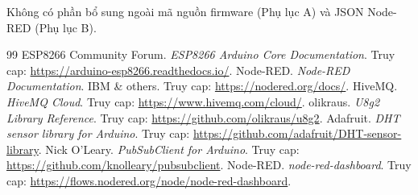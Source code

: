 \documentclass[13pt,a4paper]{article}
\begin{document}
Không có phần bổ sung ngoài mã nguồn firmware (Phụ lục A) và JSON Node-RED (Phụ lục B).

\begin{thebibliography}{99}
    \fontsize{12}{14}\selectfont
     ESP8266 Community Forum. \textit{ESP8266 Arduino Core Documentation}. Truy cap: \url{https://arduino-esp8266.readthedocs.io/}.
     Node-RED. \textit{Node-RED Documentation}. IBM \& others. Truy cap: \url{https://nodered.org/docs/}.
     HiveMQ. \textit{HiveMQ Cloud}. Truy cap: \url{https://www.hivemq.com/cloud/}.
    olikraus. \textit{U8g2 Library Reference}. Truy cap: \url{https://github.com/olikraus/u8g2}.
    Adafruit. \textit{DHT sensor library for Arduino}. Truy cap: \url{https://github.com/adafruit/DHT-sensor-library}.
    Nick O'Leary. \textit{PubSubClient for Arduino}. Truy cap: \url{https://github.com/knolleary/pubsubclient}.
    Node-RED. \textit{node-red-dashboard}. Truy cap: \url{https://flows.nodered.org/node/node-red-dashboard}.
\end{thebibliography}

\end{document}
